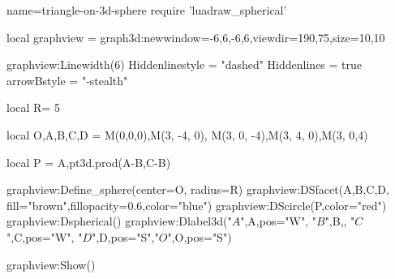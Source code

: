 \documentclass{standalone}
\begin{document}
\begin{luadraw}{name=triangle-on-3d-sphere}
require 'luadraw_spherical'

local graphview = graph3d:new{window={-6,6,-6,6},viewdir={190,75},size={10,10}}

graphview:Linewidth(6)
Hiddenlinestyle = "dashed"
Hiddenlines = true
arrowBstyle = "-stealth"

local R= 5

local O,A,B,C,D = M(0,0,0),M(3, -4, 0), M(3, 0, -4),M(3, 4, 0),M(3, 0,4)

local P = {A,pt3d.prod(A-B,C-B)}

graphview:Define_sphere({center=O, radius=R})
graphview:DSfacet({A,B,C,D}, {fill="brown",fillopacity=0.6,color="blue"})
graphview:DScircle(P,{color="red"})
graphview:Dspherical()
graphview:Dlabel3d("$A$",A,{pos="W"}, "$B$",B,{}, "$C$",C,{pos="W"}, "$D$",D,{pos="S"},"$O$",O,{pos="S"})

graphview:Show()
\end{luadraw}
\end{document}
